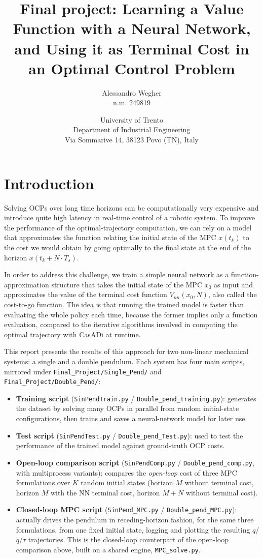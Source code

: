 \documentclass[11pt,a4paper]{article}
\title{Final project: Learning a Value Function with a Neural Network,\\
and Using it as Terminal Cost in an Optimal Control Problem}
\author{Alessandro Wegher \\ n.m. 249819}
\date{University of Trento \\ Department of Industrial Engineering \\ Via Sommarive 14, 38123 Povo (TN), Italy}
\begin{document}
\maketitle

\section{Introduction}

Solving OCPs over long time horizons can be computationally very expensive and introduce
quite high latency in real-time control of a robotic system. To improve the performance of
the optimal-trajectory computation, we can rely on a model that approximates the function
relating the initial state of the MPC $x(t_k)$ to the cost we would obtain by going optimally
to the final state at the end of the horizon $x(t_k + N \cdot T_s)$.

In order to address this challenge, we train a simple neural network as a function-approximation
structure that takes the initial state of the MPC $x_0$ as input and approximates the value of
the terminal cost function $V_{nn}(x_0, N)$, also called the cost-to-go function. The idea is
that running the trained model is faster than evaluating the whole policy each time, because
the former implies only a function evaluation, compared to the iterative algorithms involved in
computing the optimal trajectory with CasADi at runtime.

This report presents the results of this approach for two non-linear mechanical systems: a
single and a double pendulum. Each system has four main scripts, mirrored under
\texttt{Final\_Project/Single\_Pend/} and \texttt{Final\_Project/Double\_Pend/}:

\begin{itemize}
  \item \textbf{Training script} (\texttt{SinPendTrain.py} / \texttt{Double\_pend\_training.py}):
        generates the dataset by solving many OCPs in parallel from random initial-state
        configurations, then trains and saves a neural-network model for later use.
  \item \textbf{Test script} (\texttt{SinPendTest.py} / \texttt{Double\_pend\_Test.py}): used to
        test the performance of the trained model against ground-truth OCP costs.
  \item \textbf{Open-loop comparison script} (\texttt{SinPendComp.py} / \texttt{Double\_pend\_comp.py},
        with multiprocess variants): compares the \emph{open-loop} cost of three MPC
        formulations over $K$ random initial states (horizon $M$ without terminal cost, horizon
        $M$ with the NN terminal cost, horizon $M+N$ without terminal cost).
  \item \textbf{Closed-loop MPC script} (\texttt{SinPend\_MPC.py} / \texttt{Double\_pend\_MPC.py}):
        actually drives the pendulum in receding-horizon fashion, for the same three
        formulations, from one fixed initial state, logging and plotting the resulting
        $q$/$\dot q$/$\tau$ trajectories. This is the closed-loop counterpart of the open-loop
        comparison above, built on a shared engine, \texttt{MPC\_solve.py}.
\end{itemize}
\end{document}
